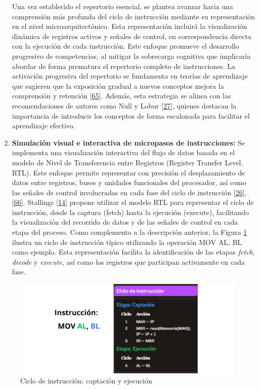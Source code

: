 \documentclass[12pt,oneside]{templates/unerthesis}
\begin{document}
\begin{enumerate}
  Una vez establecido el repertorio esencial, se plantea avanzar hacia una comprensión más profunda del ciclo de instrucción mediante su representación en el nivel microarquitectónico. Esta representación incluirá la visualización dinámica de registros activos y señales de control, en correspondencia directa con la ejecución de cada instrucción. Este enfoque promueve el desarrollo progresivo de competencias, al mitigar la sobrecarga cognitiva que implicaría abordar de forma prematura el repertorio completo de instrucciones. La activación progresiva del repertorio se fundamenta en teorías de aprendizaje que sugieren que la exposición gradual a nuevos conceptos mejora la comprensión y retención \protect\hyperlink{ref-sweller2010cognitive}{{[}65{]}}. Además, esta estrategia se alinea con las recomendaciones de autores como Null y Lobur \protect\hyperlink{ref-null_essentials_2023}{{[}27{]}}, quienes destacan la importancia de introducir los conceptos de forma escalonada para facilitar el aprendizaje efectivo.
\item
  \textbf{Simulación visual e interactiva de micropasos de instrucciones:}
  Se implementa una visualización interactiva del flujo de datos basada en el modelo de Nivel de Transferencia entre Registros (Register Transfer Level, RTL). Este enfoque permite representar con precisión el desplazamiento de datos entre registros, buses y unidades funcionales del procesador, así como las señales de control involucradas en cada fase del ciclo de instrucción \protect\hyperlink{ref-harris2015digital}{{[}26{]}}, \protect\hyperlink{ref-ASMVisualizer2025}{{[}66{]}}. Stallings \protect\hyperlink{ref-stallings_computer_2021}{{[}14{]}} propone utilizar el modelo RTL para representar el ciclo de instrucción, desde la captura (fetch) hasta la ejecución (execute), facilitando la visualización del recorrido de datos y de las señales de control en cada etapa del proceso.
  Como complemento a la descripción anterior, la Figura \ref{fig:cicloinstruccion} ilustra un ciclo de instrucción típico utilizando la operación MOV AL, BL como ejemplo. Esta representación facilita la identificación de las etapas \emph{fetch}, \emph{decode} y \emph{execute}, así como los registros que participan activamente en cada fase.
\end{enumerate}

\begin{figure}

{\centering \includegraphics[width=0.85\linewidth]{images/cicloinstruccion} 

}

\caption{Ciclo de instrucción: captación y ejecución}\label{fig:cicloinstruccion}
\end{figure}
\end{document}
